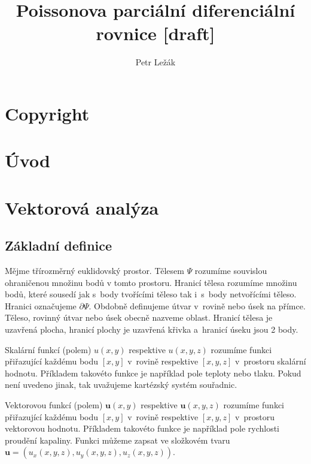\documentclass{book}
\title{Poissonova parciální diferenciální rovnice [draft]}
\author{Petr Ležák}
\newcommand{\vect}[1]{\boldsymbol{#1}}
\begin{document}
\maketitle

\chapter{Copyright}



\chapter{Úvod}

\chapter{Vektorová analýza}

\section{Základní definice}

Mějme třírozměrný euklidovský prostor. Tělesem \(\Psi\) rozumíme souvislou ohraničenou množinu bodů v tomto prostoru. Hranicí tělesa rozumíme množinu bodů, které sousedí jak s~body tvořícími těleso tak i~s~body netvořícími těleso. Hranici označujeme \(\partial \Psi\). Obdobně definujeme útvar v~rovině nebo úsek na přímce. Těleso, rovinný útvar nebo úsek obecně nazveme oblast. Hranicí tělesa je uzavřená plocha, hranicí plochy je uzavřená křivka a~hranicí úseku jsou 2 body. 


Skalární funkcí (polem) \(u(x, y)\) respektive \(u(x, y, z)\) rozumíme funkci přiřazující každému bodu \([x, y]\) v~rovině respektive \([x, y, z]\) v~prostoru skalární hodnotu. Příkladem takovéto funkce je například pole teploty nebo tlaku. Pokud není uvedeno jinak, tak uvažujeme kartézský systém souřadnic. 

Vektorovou funkcí (polem) \(\vect{u}(x, y)\) respektive \(\vect{u}(x, y, z)\) rozumíme funkci přiřazující každému bodu \([x, y]\)
 v~rovině respektive \([x, y, z]\) v~prostoru vektorovou hodnotu. Příkladem takovéto funkce je například pole rychlosti proudění kapaliny. Funkci můžeme zapsat ve složkovém tvaru \(\vect{u}=(u_x(x, y, z), u_y(x, y, z), u_z(x, y, z))\).
\end{document}
